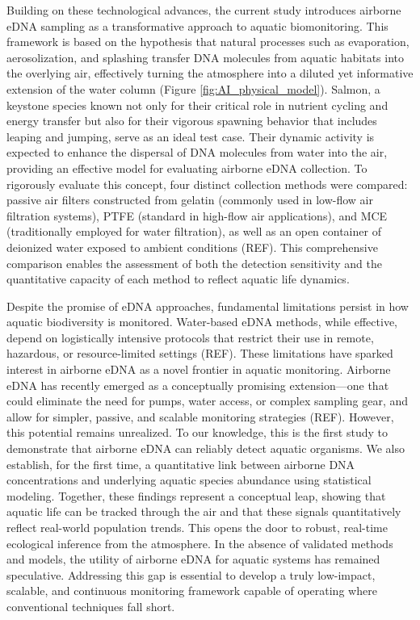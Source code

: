 \documentclass{article}
\begin{document}
Building on these technological advances, the current study introduces airborne eDNA sampling as a transformative approach to aquatic biomonitoring. This framework is based on the hypothesis that natural processes such as evaporation, aerosolization, and splashing transfer DNA molecules from aquatic habitats into the overlying air, effectively turning the atmosphere into a diluted yet informative extension of the water column (Figure \ref{fig:AI_physical_model}). Salmon, a keystone species known not only for their critical role in nutrient cycling and energy transfer but also for their vigorous spawning behavior that includes leaping and jumping, serve as an ideal test case. Their dynamic activity is expected to enhance the dispersal of DNA molecules from water into the air, providing an effective model for evaluating airborne eDNA collection. To rigorously evaluate this concept, four distinct collection methods were compared: passive air filters constructed from gelatin (commonly used in low-flow air filtration systems), PTFE (standard in high-flow air applications), and MCE (traditionally employed for water filtration), as well as an open container of deionized water exposed to ambient conditions (REF). This comprehensive comparison enables the assessment of both the detection sensitivity and the quantitative capacity of each method to reflect aquatic life dynamics.

Despite the promise of eDNA approaches, fundamental limitations persist in how aquatic biodiversity is monitored. Water-based eDNA methods, while effective, depend on logistically intensive protocols that restrict their use in remote, hazardous, or resource-limited settings (REF). These limitations have sparked interest in airborne eDNA as a novel frontier in aquatic monitoring. Airborne eDNA has recently emerged as a conceptually promising extension—one that could eliminate the need for pumps, water access, or complex sampling gear, and allow for simpler, passive, and scalable monitoring strategies (REF). However, this potential remains unrealized. To our knowledge, this is the first study to demonstrate that airborne eDNA can reliably detect aquatic organisms. We also establish, for the first time, a quantitative link between airborne DNA concentrations and underlying aquatic species abundance using statistical modeling. Together, these findings represent a conceptual leap, showing that aquatic life can be tracked through the air and that these signals quantitatively reflect real-world population trends. This opens the door to robust, real-time ecological inference from the atmosphere. In the absence of validated methods and models, the utility of airborne eDNA for aquatic systems has remained speculative. Addressing this gap is essential to develop a truly low-impact, scalable, and continuous monitoring framework capable of operating where conventional techniques fall short.
\end{document}

